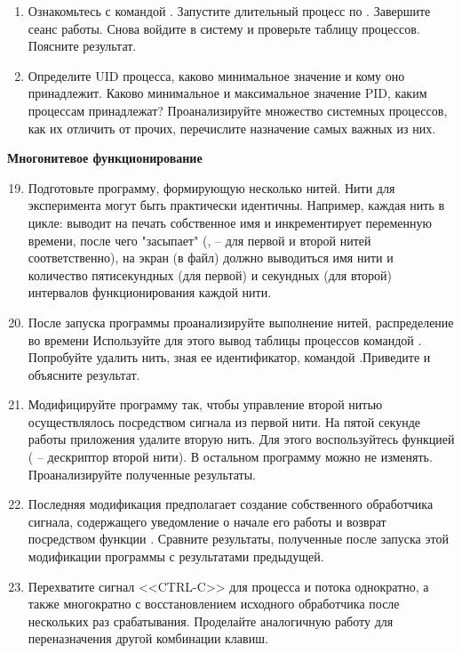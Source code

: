 \begin{enumerate}
	\item Ознакомьтесь с командой . Запустите длительный процесс по . Завершите сеанс работы. Снова войдите в систему и проверьте таблицу процессов. Поясните результат.
	\item Определите UID процесса, каково минимальное значение и кому оно принадлежит. Каково минимальное и максимальное значение PID, каким процессам принадлежат? Проанализируйте множество системных процессов, как их отличить от прочих, перечислите назначение самых важных из них.
\end{enumerate}

\textbf{Многонитевое функционирование}

\begin{enumerate}
	\setcounter{enumi}{18}
	\item Подготовьте программу, формирующую несколько нитей. Нити для эксперимента могут быть практически идентичны. Например, каждая нить в цикле: выводит на печать собственное имя и инкрементирует переменную времени, после чего "засыпает" (,  -- для первой и второй нитей соответственно), на экран (в файл) должно выводиться имя нити и количество пятисекундных (для первой) и секундных (для второй) интервалов функционирования каждой нити.
	\item После запуска программы проанализируйте выполнение нитей, распределение во времени Используйте для этого вывод таблицы процессов командой . Попробуйте удалить нить, зная ее идентификатор, командой .Приведите и объясните результат.
	\item Модифицируйте программу так, чтобы управление второй нитью осуществлялось посредством сигнала  из первой нити. На пятой секунде работы приложения удалите вторую нить. Для этого воспользуйтесь функцией  ( -- дескриптор второй нити). В остальном программу можно не изменять. Проанализируйте полученные
	результаты.
	\item Последняя модификация предполагает создание собственного обработчика сигнала, содержащего уведомление о начале его работы и возврат посредством функции . Сравните результаты, полученные после запуска этой модификации программы с результатами предыдущей.
	\item Перехватите сигнал <<CTRL-C>> для процесса и потока однократно, а также многократно с восстановлением исходного обработчика после нескольких раз срабатывания. Проделайте аналогичную работу для переназначения другой комбинации клавиш.

\end{enumerate}
